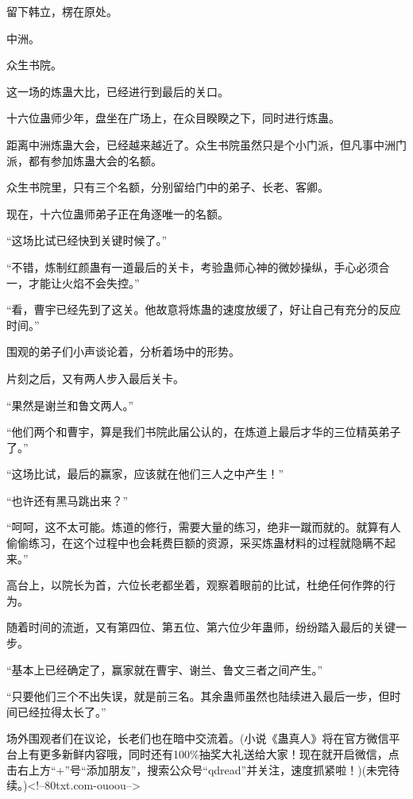 \begin{this_body}
留下韩立，楞在原处。

中洲。

众生书院。

这一场的炼蛊大比，已经进行到最后的关口。

十六位蛊师少年，盘坐在广场上，在众目睽睽之下，同时进行炼蛊。

距离中洲炼蛊大会，已经越来越近了。众生书院虽然只是个小门派，但凡事中洲门派，都有参加炼蛊大会的名额。

众生书院里，只有三个名额，分别留给门中的弟子、长老、客卿。

现在，十六位蛊师弟子正在角逐唯一的名额。

“这场比试已经快到关键时候了。”

“不错，炼制红颜蛊有一道最后的关卡，考验蛊师心神的微妙操纵，手心必须合一，才能让火焰不会失控。”

“看，曹宇已经先到了这关。他故意将炼蛊的速度放缓了，好让自己有充分的反应时间。”

围观的弟子们小声谈论着，分析着场中的形势。

片刻之后，又有两人步入最后关卡。

“果然是谢兰和鲁文两人。”

“他们两个和曹宇，算是我们书院此届公认的，在炼道上最后才华的三位精英弟子了。”

“这场比试，最后的赢家，应该就在他们三人之中产生！”

“也许还有黑马跳出来？”

“呵呵，这不太可能。炼道的修行，需要大量的练习，绝非一蹴而就的。就算有人偷偷练习，在这个过程中也会耗费巨额的资源，采买炼蛊材料的过程就隐瞒不起来。”

高台上，以院长为首，六位长老都坐着，观察着眼前的比试，杜绝任何作弊的行为。

随着时间的流逝，又有第四位、第五位、第六位少年蛊师，纷纷踏入最后的关键一步。

“基本上已经确定了，赢家就在曹宇、谢兰、鲁文三者之间产生。”

“只要他们三个不出失误，就是前三名。其余蛊师虽然也陆续进入最后一步，但时间已经拉得太长了。”

场外围观者们在议论，长老们也在暗中交流着。(小说《蛊真人》将在官方微信平台上有更多新鲜内容哦，同时还有100\%抽奖大礼送给大家！现在就开启微信，点击右上方“+”号“添加朋友”，搜索公众号“qdread”并关注，速度抓紧啦！)(未完待续。)<!--80txt.com-ouoou-->

\end{this_body}

